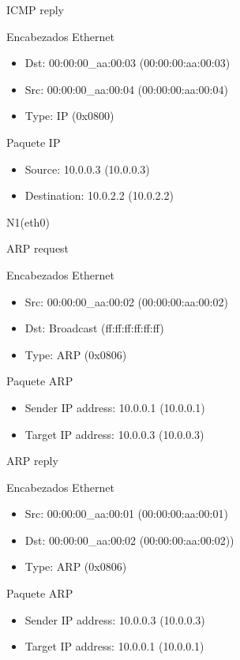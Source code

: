 \documentclass[a4paper,11pt]{article} %
\begin{document}
\setlength{\leftskip}{1cm}ICMP reply

\indent\indent Encabezados Ethernet
\begin{itemize}
    \setlength{\itemindent}{80px}
    \item Dst: 00:00:00\_aa:00:03 (00:00:00:aa:00:03)
    \item Src: 00:00:00\_aa:00:04 (00:00:00:aa:00:04)
    \item Type: IP (0x0800)
\end{itemize}

\indent\indent Paquete IP
\begin{itemize}
    \setlength{\itemindent}{80px}
    \item Source: 10.0.0.3 (10.0.0.3)
    \item Destination: 10.0.2.2 (10.0.2.2)
\end{itemize}

\setlength{\leftskip}{0.5cm}N1(eth0)

\setlength{\leftskip}{1cm}ARP request\par
\indent\indent Encabezados Ethernet
\begin{itemize}
    \setlength{\itemindent}{80px}
    \item Src: 00:00:00\_aa:00:02 (00:00:00:aa:00:02)
    \item Dst: Broadcast (ff:ff:ff:ff:ff:ff)
    \item Type: ARP (0x0806)
\end{itemize}

\indent\indent Paquete ARP
\begin{itemize}
    \setlength{\itemindent}{80px}
    \item Sender IP address: 10.0.0.1 (10.0.0.1)
    \item Target IP address: 10.0.0.3 (10.0.0.3)
\end{itemize}

\setlength{\leftskip}{1cm}ARP reply\par
\indent\indent Encabezados Ethernet
\begin{itemize}
    \setlength{\itemindent}{80px}
    \item Src: 00:00:00\_aa:00:01 (00:00:00:aa:00:01)
    \item Dst: 00:00:00\_aa:00:02 (00:00:00:aa:00:02))
    \item Type: ARP (0x0806)
\end{itemize}

\indent\indent Paquete ARP
\begin{itemize}
    \setlength{\itemindent}{80px}
    \item Sender IP address: 10.0.0.3 (10.0.0.3)
    \item Target IP address: 10.0.0.1 (10.0.0.1)
\end{itemize}
\end{document}
